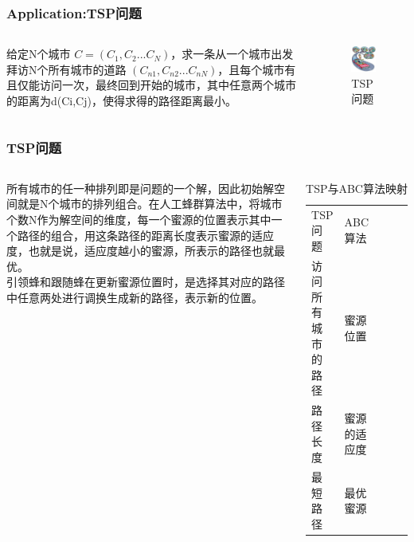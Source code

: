 \begin{frame}
	\frametitle{Application:TSP问题}
	\begin{columns}
	\qquad 给定N个城市 $C=(C_{1},C_{2}...C_{N})$，求一条从一个城市出发拜访N个所有城市的道路 $(C_{n1},C_{n2}...C_{nN})$，且每个城市有且仅能访问一次，最终回到开始的城市，其中任意两个城市的距离为d(Ci,Cj)，使得求得的路径距离最小。
	\begin{figure}[htbp]
		\flushleft
		\includegraphics[width=3cm]{pic/bee6.jpg}
		\caption{TSP问题}
	\end{figure}
	\end{columns}
\end{frame}

\begin{frame}
	\frametitle{TSP问题}
	\begin{columns}
	\column{.6\textwidth}
	\qquad 所有城市的任一种排列即是问题的一个解，因此初始解空间就是N个城市的排列组合。在人工蜂群算法中，将城市个数N作为解空间的维度，每一个蜜源的位置表示其中一个路径的组合，用这条路径的距离长度表示蜜源的适应度，也就是说，适应度越小的蜜源，所表示的路径也就最优。\\
	\qquad 引领蜂和跟随蜂在更新蜜源位置时，是选择其对应的路径中任意两处进行调换生成新的路径，表示新的位置。
	\column{.4\textwidth}
	\begin{table}[]
	\centering
	\caption{TSP与ABC算法映射}
	\label{my-label}
	\begin{tabular}{|l|l|lll}
	\cline{1-2}
	TSP问题     & ABC算法  &  &  &  \\ \cline{1-2}
	访问所有城市的路径 & 蜜源位置   &  &  &  \\ \cline{1-2}
	路径长度      & 蜜源的适应度 &  &  &  \\ \cline{1-2}	
	最短路径      & 最优蜜源   &  &  &  \\ \cline{1-2}
	\end{tabular}
	\end{table}
	\end{columns}
\end{frame}

